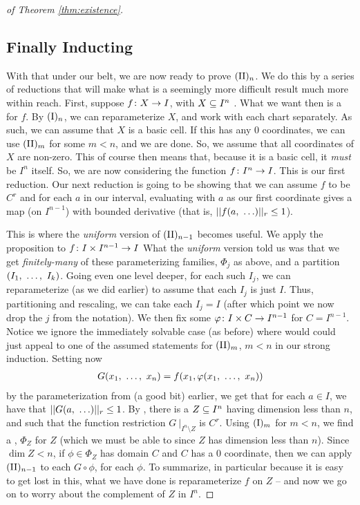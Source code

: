 \begin{proof}[of Theorem \ref{thm:existence}]
    \subsection{Finally Inducting}

    With that under our belt, we are now ready to prove $\IIn[n]$. We do this by a series of reductions that will make what is a seemingly more difficult result much more within reach. First, suppose $\funcdom{f}{X}{I}$, with $\CIn[X]{n}$ . What we want then is a \cellrparam for $f$. By $\In[n]$, we can reparameterize $X$, and work with each chart separately. As such, we can assume that $X$ is a basic cell. If this has any 0 coordinates, we can use $\IIn[m]$ for some $m < n$, and we are done. So, we assume that all coordinates of $X$ are non-zero. This of course then means that, because it is a basic cell, it \emph{must} be $I^n$ itself. So, we are now considering the function $\funcdom{f}{I^n}{I}$. This is our first reduction. Our next reduction is going to be showing that we can assume $f$ to be $C^r$ and for each $a$ in our interval, evaluating with $a$ as our first coordinate gives a map (on $I^{n-1}$) with bounded derivative  (that is, $\rnorm{f(a, \ \hdots)} \leq 1$).

    This is where the \emph{uniform} version of $\IIn[n-1]$ becomes useful. We apply the proposition to $\funcdom{f}{I \times I^{n-1}}{I}$ What the \emph{uniform} version told us was that we get \emph{finitely-many} of these parameterizing families, $\Phi_j$ as above, and a partition $(\vonevm{I}{k})$. Going even one level deeper, for each such $I_j$, we can reparameterize (as we did earlier) to assume that each $I_j$ is just $I$. Thus, partitioning and rescaling, we can take each $I_j = I$ (after which point we now drop the $j$ from the notation). We then fix some $\funcdom{\phi}{I \times C}{I^{n-1}}$ for $C = I^{n - 1}$. Notice we ignore the immediately solvable case (as before) where would could just appeal to one of the assumed statements for $\IIn[m]$, $m < n$ in our strong induction. Setting now
     \begin{align*}
       G(\vonevm{x}{n}) = f(x_1, \phi(\vonevm{x}{n}))
     \end{align*}
     by the parameterization from (a good bit) earlier, we get that for each $a \in I$, we have that $\rnorm{G(a, \ \hdots)} \leq 1$. By \scd, there is a  $\CIn[Z]{n}$ having dimension less than $n$, and such that the function restriction $G \ \vert_{I^n \setminus Z}$ is $C^r$. Using $\In[m]$ for $m < n$, we find a \cellrparam, $\Phi_Z$ for $Z$ (which we must be able to since $Z$ has dimension less than $n$). Since $\dim{Z} < n$, if $\phi \in \Phi_Z$ has domain $C$ and $C$ has a 0 coordinate, then we can apply $\IIn[n-1]$ to each $G \circ \phi$, for each $\phi$. To summarize, in particular because it is easy to get lost in this, what we have done is reparameterize $f$ on $Z$ -- and now we go on to worry about the complement of $Z$ in $I^n$.


\end{proof}
